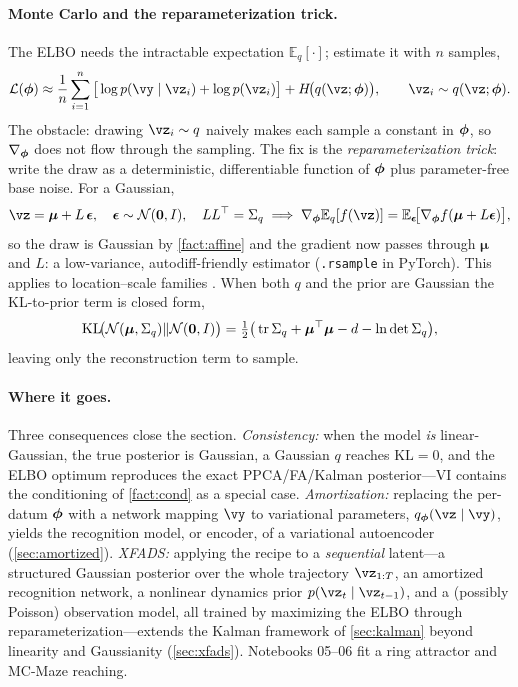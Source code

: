 \documentclass[11pt]{article}
\theoremstyle{plain}
\theoremstyle{definition}
\theoremstyle{remark}
\theoremstyle{definition}
\newcommand{\E}{\mathbb{E}}
\newcommand{\Normal}{\mathcal{N}}
\newcommand{\vmu}{\bm{\mu}}
\begin{document}
\paragraph{Monte Carlo and the reparameterization trick.} The ELBO needs the
intractable expectation $\E_q[\cdot]$; estimate it with $n$ samples,
\begin{equation}\label{eq:vi-mc}
    \mathcal{L}(\vphi) \approx \frac1n\sum_{i=1}^n \big[\log p(\vy\mid\vz_i)
        + \log p(\vz_i)\big] + H\!\big(q(\vz;\vphi)\big), \qquad \vz_i \sim q(\vz;\vphi) .
\end{equation}
The obstacle: drawing $\vz_i \sim q$ naively makes each sample a constant in
$\bm{\phi}$, so $\nabla_{\bm{\phi}}$ does not flow through the sampling. The fix is the
\emph{reparameterization trick}: write the draw as a deterministic, differentiable
function of $\bm{\phi}$ plus parameter-free base noise. For a Gaussian,
\begin{equation}\label{eq:vi-reparam}
    \vz = \vmu + L\,\bm{\epsilon}, \quad \bm{\epsilon}\sim\Normal(\mathbf 0, I),
    \quad L L\trp = \Sigma_q
    \;\Longrightarrow\;
    \nabla_{\vphi}\E_{q}[f(\vz)] = \E_{\bm{\epsilon}}\!\big[\nabla_{\vphi} f(\vmu + L\bm{\epsilon})\big] ,
\end{equation}
so the draw is Gaussian by \cref{fact:affine} and the gradient now passes through
$\vmu$ and $L$: a low-variance, autodiff-friendly estimator (\texttt{.rsample} in
PyTorch). This applies to location--scale families
\parencite{KingmaWelling2014-vae, Rezende2014-sbp}. When both $q$ and the prior are
Gaussian the KL-to-prior term is closed form,
\begin{equation}\label{eq:vi-gaussKL}
    \mathrm{KL}\!\big(\Normal(\vmu, \Sigma_q)\Vert\Normal(\mathbf 0, I)\big)
        = \tfrac12\big(\tr\Sigma_q + \vmu\trp\vmu - d - \ln\det\Sigma_q\big) ,
\end{equation}
leaving only the reconstruction term to sample.

\paragraph{Where it goes.} Three consequences close the section. \emph{Consistency:}
when the model \emph{is} linear-Gaussian, the true posterior is Gaussian, a
Gaussian $q$ reaches $\mathrm{KL} = 0$, and the ELBO optimum reproduces the exact
PPCA/FA/Kalman posterior---VI contains the conditioning of \cref{fact:cond} as a
special case. \emph{Amortization:} replacing the per-datum $\bm{\phi}$ with a
network mapping $\vy$ to variational parameters, $q_{\vphi}(\vz\mid\vy)$, yields the
recognition model, or encoder, of a variational autoencoder (\cref{sec:amortized}).
\emph{XFADS:} applying the recipe to a \emph{sequential} latent---a structured
Gaussian posterior over the whole trajectory $\vz_{1:T}$, an amortized recognition
network, a nonlinear dynamics prior $p(\vz_t\mid\vz_{t-1})$, and a (possibly
Poisson) observation model, all trained by maximizing the ELBO through
reparameterization---extends the Kalman framework of \cref{sec:kalman} beyond
linearity and Gaussianity (\cref{sec:xfads}). Notebooks 05--06 fit a ring
attractor and MC-Maze reaching.
\end{document}
